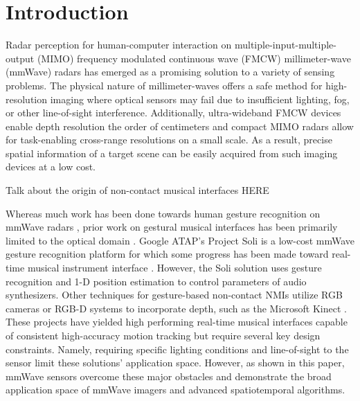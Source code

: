\documentclass[10pt,journal,final]{IEEEtran}
\begin{document}
\section{Introduction}
\label{sec:introduction}
Radar perception for human-computer interaction on multiple-input-multiple-output (MIMO) frequency modulated continuous wave (FMCW) millimeter-wave (mmWave) radars has emerged as a promising solution to a variety of sensing problems. The physical nature of millimeter-waves offers a safe method for high-resolution imaging where optical sensors may fail due to insufficient lighting, fog, or other line-of-sight interference. Additionally, ultra-wideband FMCW devices enable depth resolution the order of centimeters and compact MIMO radars allow for task-enabling cross-range resolutions on a small scale. As a result, precise spatial information of a target scene can be easily acquired from such imaging devices at a low cost.

Talk about the origin of non-contact musical interfaces HERE

Whereas much work has been done towards human gesture recognition on mmWave radars \cite{intro:gestureRecognition,intro:gestureRecognition2}, prior work on gestural musical interfaces has been primarily limited to the optical domain \cite{ieeetm:real_time_piano_music_transcription, ieeetm:training_surrogate_sensors}. Google ATAP's Project Soli \cite{Google:Soli} is a low-cost mmWave gesture recognition platform for which some progress has been made toward real-time musical instrument interface \cite{intro:soli_musical_instrument}. However, the Soli solution uses gesture recognition and 1-D position estimation to control parameters of audio synthesizers. Other techniques for gesture-based non-contact NMIs utilize RGB cameras \cite{intro:RGBcamera} or RGB-D systems to incorporate depth, such as the Microsoft Kinect \cite{intro:kinect}. These projects have yielded high performing real-time musical interfaces capable of consistent high-accuracy motion tracking but require several key design constraints. Namely, requiring specific lighting conditions and line-of-sight to the sensor limit these solutions' application space. However, as shown in this paper, mmWave sensors overcome these major obstacles and demonstrate the broad application space of mmWave imagers and advanced spatiotemporal algorithms. 
\end{document}
